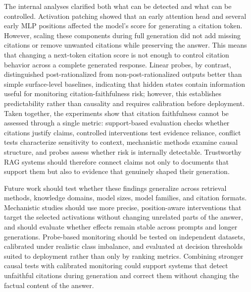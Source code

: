 \documentclass[11pt]{article}
\begin{document}
The internal analyses clarified both what can be detected and what can be controlled. Activation patching showed that an early attention head and several early MLP positions affected the model's score for generating a citation token. However, scaling these components during full generation did not add missing citations or remove unwanted citations while preserving the answer. This means that changing a next-token citation score is not enough to control citation behavior across a complete generated response. Linear probes, by contrast, distinguished post-rationalized from non-post-rationalized outputs better than simple surface-level baselines, indicating that hidden states contain information useful for monitoring citation-faithfulness risk; however, this establishes predictability rather than causality and requires calibration before deployment. Taken together, the experiments show that citation faithfulness cannot be assessed through a single metric: support-based evaluation checks whether citations justify claims, controlled interventions test evidence reliance, conflict tests characterize sensitivity to context, mechanistic methods examine causal structure, and probes assess whether risk is internally detectable. Trustworthy RAG systems should therefore connect claims not only to documents that support them but also to evidence that genuinely shaped their generation.

Future work should test whether these findings generalize across retrieval methods, knowledge domains, model sizes, model families, and citation formats. Mechanistic studies should use more precise, position-aware interventions that target the selected activations without changing unrelated parts of the answer, and should evaluate whether effects remain stable across prompts and longer generations. Probe-based monitoring should be tested on independent datasets, calibrated under realistic class imbalance, and evaluated at decision thresholds suited to deployment rather than only by ranking metrics. Combining stronger causal tests with calibrated monitoring could support systems that detect unfaithful citations during generation and correct them without changing the factual content of the answer.



\end{document}
